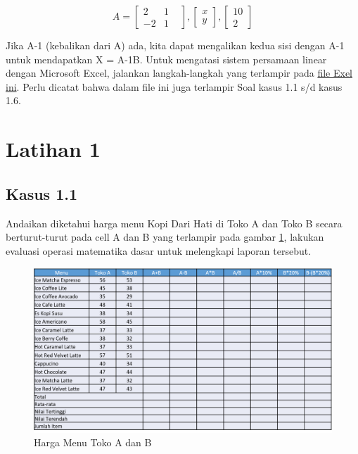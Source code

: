 \documentclass[
]{book}
\begin{document}
\[ A=
\begin{bmatrix}
    2 & 1 &  \\
   -2 & 1 
\end{bmatrix}, 
\begin{bmatrix}
    x  \\
   y 
\end{bmatrix},
\begin{bmatrix}
    10  \\
   2 
\end{bmatrix}
\]

Jika A-1 (kebalikan dari A) ada, kita dapat mengalikan kedua sisi dengan A-1 untuk mendapatkan X = A-1B. Untuk mengatasi sistem persamaan linear dengan Microsoft Excel, jalankan langkah-langkah yang terlampir pada \href{https://github.com/Bakti-Siregar/Matematika-Bisnis/raw/master/data/dasar-matematika-bisnis.xlsx}{file Exel ini}. Perlu dicatat bahwa dalam file ini juga terlampir Soal kasus 1.1 s/d kasus 1.6.

\hypertarget{latihan-1}{%
\section{Latihan 1}\label{latihan-1}}

\hypertarget{kasus-1.1}{%
\subsection*{Kasus 1.1}\label{kasus-1.1}}

Andaikan diketahui harga menu Kopi Dari Hati di Toko A dan Toko B secara berturut-turut pada cell A dan B yang terlampir pada gambar \ref{fig:tabel1}, lakukan evaluasi operasi matematika dasar untuk melengkapi laporan tersebut.

\begin{figure}

{\centering \includegraphics[width=1\linewidth]{images/tabel1} 

}

\caption{Harga Menu Toko A dan B}\label{fig:tabel1}
\end{figure}
\end{document}
